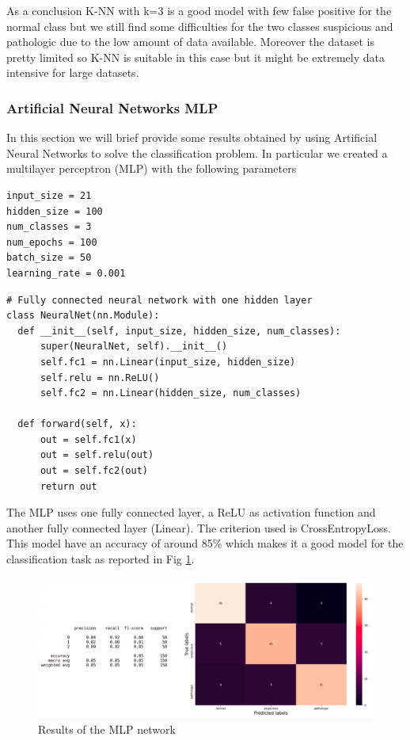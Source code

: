 \documentclass[a4paper,12pt]{article}
\begin{document}
\noindent As a conclusion K-NN with k=3 is a good model with few false positive for the normal class but we still find some difficulties for the two classes suspicious and pathologic due to the low amount of data available. Moreover the dataset is pretty limited so K-NN is suitable in this case but it might be extremely data intensive for large datasets.

\subsubsection{Artificial Neural Networks MLP}
In this section we will brief provide some results obtained by using Artificial Neural Networks to solve the classification problem. In particular we created a multilayer perceptron (MLP) with the following parameters
\begin{Verbatim}[fontsize=\small]
input_size = 21
hidden_size = 100
num_classes = 3
num_epochs = 100
batch_size = 50
learning_rate = 0.001
\end{Verbatim} 

\begin{Verbatim}[fontsize=\small]
# Fully connected neural network with one hidden layer
class NeuralNet(nn.Module):
  def __init__(self, input_size, hidden_size, num_classes):
      super(NeuralNet, self).__init__()
      self.fc1 = nn.Linear(input_size, hidden_size) 
      self.relu = nn.ReLU()
      self.fc2 = nn.Linear(hidden_size, num_classes)  
  
  def forward(self, x):
      out = self.fc1(x)
      out = self.relu(out)
      out = self.fc2(out)
      return out
\end{Verbatim}

\noindent The MLP uses one fully connected layer, a ReLU as activation function and another fully connected layer (Linear). The criterion used is CrossEntropyLoss. This model have an accuracy of around 85\% which makes it a good model for the classification task as reported in Fig \ref{fig:annres}.

\begin{figure}[H]
  \begin{center}
  \includegraphics[width=1.0\textwidth]{images/ann_res.png}
  \end{center}
  \caption{Results of the MLP network}
  \label{fig:annres}
\end{figure}
\end{document}
